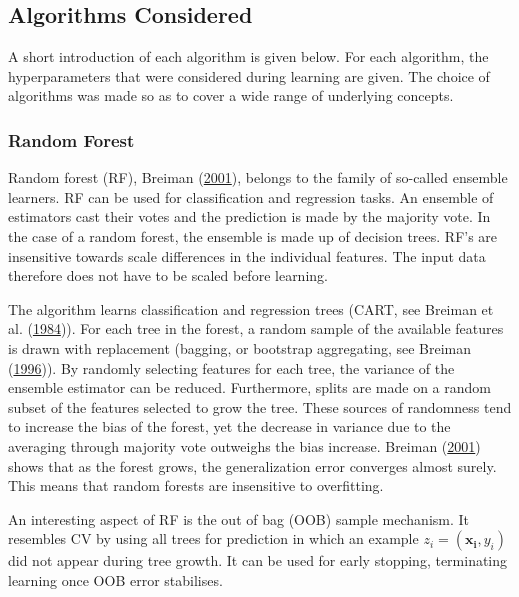 \documentclass[
  11pt,
  a4paper,
  DIV=12,captions=tableheading,oneside,titlepage=firstiscover,abstracton]{scrreprt}
\begin{document}
\hypertarget{algorithms-considered}{%
\subsection{Algorithms Considered}\label{algorithms-considered}}

A short introduction of each algorithm is given below. For each algorithm, the hyperparameters that were considered during learning are given. The choice of algorithms was made so as to cover a wide range of underlying concepts.

\hypertarget{random-forest}{%
\subsubsection{Random Forest}\label{random-forest}}

Random forest (RF), Breiman (\protect\hyperlink{ref-breiman2001rf}{2001}), belongs to the family of so-called ensemble learners. RF can be used for classification and regression tasks. An ensemble of estimators cast their votes and the prediction is made by the majority vote. In the case of a random forest, the ensemble is made up of decision trees. RF's are insensitive towards scale differences in the individual features. The input data therefore does not have to be scaled before learning.

The algorithm learns classification and regression trees (CART, see Breiman et al. (\protect\hyperlink{ref-breiman1984classification}{1984})). For each tree in the forest, a random sample of the available features is drawn with replacement (bagging, or bootstrap aggregating, see Breiman (\protect\hyperlink{ref-breiman1996bagging}{1996})). By randomly selecting features for each tree, the variance of the ensemble estimator can be reduced. Furthermore, splits are made on a random subset of the features selected to grow the tree. These sources of randomness tend to increase the bias of the forest, yet the decrease in variance due to the averaging through majority vote outweighs the bias increase. Breiman (\protect\hyperlink{ref-breiman2001rf}{2001}) shows that as the forest grows, the generalization error converges almost surely. This means that random forests are insensitive to overfitting.

An interesting aspect of RF is the out of bag (OOB) sample mechanism. It resembles CV by using all trees for prediction in which an example \(z_i = (\mathbf{x_i}, y_i)\) did not appear during tree growth. It can be used for early stopping, terminating learning once OOB error stabilises.
\end{document}
